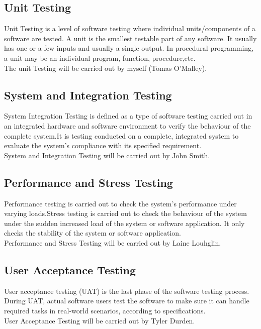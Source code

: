 \subsection{Unit Testing}
Unit Testing is a level of software testing where individual units/components of a software are tested. A unit is the smallest testable part of any software. It usually has one or a few inputs and usually a single output. In procedural programming, a unit may be an individual program, function, procedure,etc.\\

The unit Testing will be carried out by myself (Tomas O'Malley).

\subsection{System and Integration Testing}
System Integration Testing is defined as a type of software testing carried out in an integrated hardware and software environment to verify the behaviour of the complete system.It is testing conducted on a complete, integrated system to evaluate the system's compliance with its specified requirement.\\

System  and Integration Testing will be carried out by John Smith.

\subsection{Performance and Stress Testing}
Performance testing is carried out to check the system's performance under varying loads.Stress testing is carried out to check the behaviour of the system under the sudden increased load of the system or software application. It only checks the stability of the system or software application.\\


Performance and Stress Testing will be carried out by Laine Louhglin.


\subsection{User Acceptance Testing}
User acceptance testing (UAT) is the last phase of the software testing process. During UAT, actual software users test the software to make sure it can handle required tasks in real-world scenarios, according to specifications.\\


User Acceptance Testing will be carried out by Tyler Durden.


